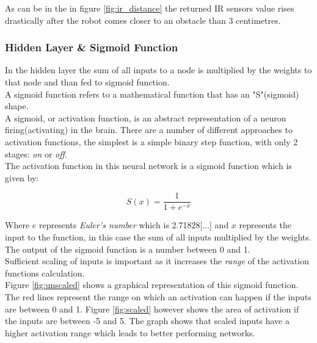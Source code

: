
As can be in the in figure \ref{fig:ir_distance} the returned IR sensors value rises drastically after the robot comes closer to an obstacle than 3 centimetres. \\


\subsubsection{Hidden Layer \& Sigmoid Function}\label{sec:hiddenlayer}
In the hidden layer the sum of all inputs to a node is multiplied by the weights to that node and than fed to sigmoid function.\\

A sigmoid function refers to a mathematical function that has an "S"(sigmoid) shape.\\
A sigmoid, or activation function, is an abstract representation of a neuron firing(activating) in the brain. There are a number of different approaches to activation functions, the simplest is a simple binary step function, with only 2 stages: \textit{on} or \textit{off}.\\
The activation function in this neural network is a sigmoid function which is given by:

\begin{equation}
S(x) = \frac{1}{1 + e^{-x}}
\end{equation} 

Where $e$ represents \textit{Euler's number} which is 2.71828[...] and $x$ represents the input to the function, in this case the sum of all inputs multiplied by the weights.\\
The output of the sigmoid function is a number between 0 and 1.\\

Sufficient scaling of inputs is important as it increases the \textit{range} of the activation functions calculation. \\
Figure  \ref{fig:unscaled} shows a graphical representation of  this sigmoid function. The red lines represent the range on which an activation can happen if the inputs are between 0 and 1. Figure \ref{fig:scaled} however shows the area of activation if the inputs are between -5 and 5. The graph shows that scaled inputs have a higher activation range which leads to better performing networks. 


